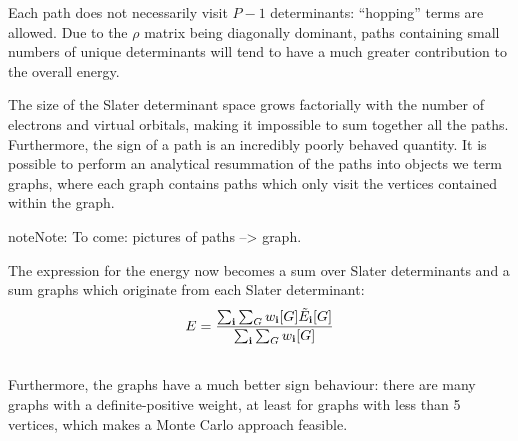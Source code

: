 \documentclass[openany,a4paper,10pt,english]{manual}
\newcommand{\veci}{\ensuremath{\mathbf{i}}}
\begin{document}
Each path does not necessarily visit $P-1$ determinants: ``hopping''
terms are allowed.  Due to the $\rho$ matrix being diagonally
dominant, paths containing small numbers of unique determinants will
tend to have a much greater contribution to the overall energy.

The size of the Slater determinant space grows factorially with the number
of electrons and virtual orbitals, making it impossible to sum together
all the paths.  Furthermore, the sign of a path is an incredibly poorly
behaved quantity.  It is possible to perform an analytical resummation
of the paths into objects we term graphs, where each graph contains
paths which only visit the vertices contained within the graph.

\begin{notice}{note}{Note:}
To come: pictures of paths --\textgreater{} graph.
\end{notice}

The expression for the energy now becomes a sum over Slater determinants and a sum graphs which originate from each Slater determinant:
\begin{gather}
\begin{split}E = \frac{\sum_{\veci} \sum_G w_{\veci}[G] \tilde{E}_{\veci}[G]}{\sum_{\veci} \sum_G w_{\veci}[G]}\end{split}\notag\\\begin{split}\end{split}\notag
\end{gather}
Furthermore, the graphs have a much better sign behaviour: there are many graphs with a definite-positive weight, at least for graphs with less than 5 vertices, which makes a Monte Carlo approach feasible.
\end{document}
